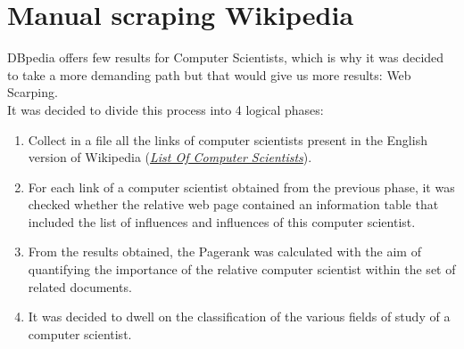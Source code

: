 \documentclass[12pt, twoside]{article}
\begin{document}
\newpage

\section{Manual scraping Wikipedia}
DBpedia offers few results for Computer Scientists, which is why it was decided to take a more demanding path but that would give us more results: Web Scarping. \\
It was decided to divide this process into 4 logical phases:
\begin{enumerate}[noitemsep, topsep=1pt]
	\item Collect in a file all the links of computer scientists present in the English version of Wikipedia (\textit{\href{https://en.wikipedia.org/wiki/List_of_computer_scientists}{List Of Computer Scientists}}).
	\item For each link of a computer scientist obtained from the previous phase, it was checked whether the relative web page contained an information table that included the list of influences and influences of this computer scientist.
	\item From the results obtained, the Pagerank was calculated with the aim of quantifying the importance of the relative computer scientist within the set of related documents.
	\item It was decided to dwell on the classification of the various fields of study of a computer scientist.
\end{enumerate}
\end{document}
